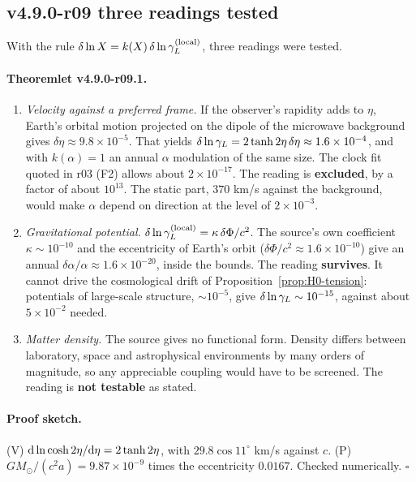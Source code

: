 \subsection*{v4.9.0-r09 three readings tested}
\label{subsec:v490-r09-readings}

With the rule \(\delta\ln X=k(X)\,\delta\ln\gamma_L^{(\mathrm{local})}\), three readings were tested.

\paragraph{Theoremlet v4.9.0-r09.1.}
\begin{enumerate}[leftmargin=2em]
\item[(V)] \emph{Velocity against a preferred frame.}  If the observer's rapidity adds to \(\eta\), Earth's orbital motion
projected on the dipole of the microwave background gives \(\delta\eta\approx9.8\times10^{-5}\).  That yields
\(\delta\ln\gamma_L=2\tanh2\eta\,\delta\eta\approx1.6\times10^{-4}\), and with \(k(\alpha)=1\) an annual \(\alpha\) modulation of the
same size.  The clock fit quoted in r03 (F2) allows about \(2\times10^{-17}\).  The reading is \textbf{excluded}, by a factor
of about \(10^{13}\).  The static part, \(370\) km/s against the background, would make \(\alpha\) depend on direction at the
level of \(2\times10^{-3}\).
\item[(P)] \emph{Gravitational potential.}  \(\delta\ln\gamma_L^{(\mathrm{local})}=\kappa\,\delta\Phi/c^2\).  The source's own
coefficient \(\kappa\sim10^{-10}\) and the eccentricity of Earth's orbit (\(\delta\Phi/c^2\approx1.6\times10^{-10}\)) give an
annual \(\delta\alpha/\alpha\approx1.6\times10^{-20}\), inside the bounds.  The reading \textbf{survives}.  It cannot drive the
cosmological drift of Proposition~\ref{prop:H0-tension}: potentials of large-scale structure, \(\sim10^{-5}\), give
\(\delta\ln\gamma_L\sim10^{-15}\), against about \(5\times10^{-2}\) needed.
\item[(D)] \emph{Matter density.}  The source gives no functional form.  Density differs between laboratory, space and
astrophysical environments by many orders of magnitude, so any appreciable coupling would have to be screened.  The
reading is \textbf{not testable} as stated.
\end{enumerate}

\paragraph{Proof sketch.}
(V) \({\rm d}\ln\cosh2\eta/{\rm d}\eta=2\tanh2\eta\), with \(29.8\cos11^\circ\) km/s against \(c\).  (P) \(GM_\odot/(c^2a)=9.87\times
10^{-9}\) times the eccentricity \(0.0167\).  Checked numerically.  \(\square\)

